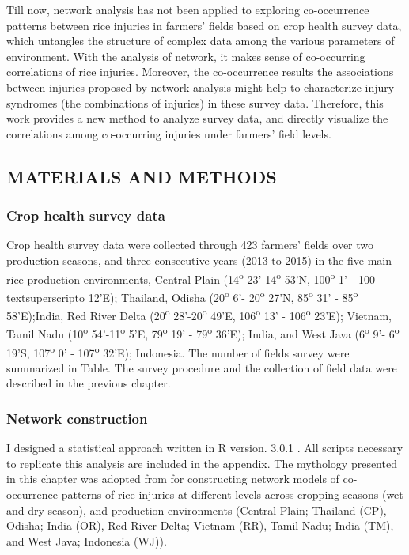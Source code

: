 Till now, network analysis has not been applied to exploring co-occurrence patterns between rice injuries in farmers’ fields based on crop health survey data, which untangles the structure of complex data among the various parameters of environment. With the analysis of network, it makes sense of co-occurring correlations of rice injuries. Moreover, the co-occurrence results the associations between injuries proposed by network analysis might help to characterize  injury syndromes (the combinations of injuries) in these survey data. Therefore, this work provides a new method to analyze survey data, and directly visualize the correlations among co-occurring injuries under farmers’ field levels.

\newpage
\subsection{MATERIALS AND METHODS} 

\subsubsection{Crop health survey data}
Crop health survey data were collected through 423 farmers’ fields over two production seasons, and three consecutive years (2013 to 2015) in the five main rice production environments, Central Plain (14\textsuperscript{o} 23’-14\textsuperscript{o} 53’N, 100\textsuperscript{o} 1’ - 100 textsuperscript{o} 12’E); Thailand, Odisha (20\textsuperscript{o} 6’- 20\textsuperscript{o} 27’N, 85\textsuperscript{o} 31’ - 85\textsuperscript{o} 58’E);India, Red River Delta (20\textsuperscript{o} 28’-20\textsuperscript{o} 49’E, 106\textsuperscript{o} 13’ - 106\textsuperscript{o}  23’E); Vietnam, Tamil Nadu (10\textsuperscript{o} 54’-11\textsuperscript{o} 5’E, 79\textsuperscript{o} 19’ - 79\textsuperscript{o}  36’E); India, and West Java (6\textsuperscript{o} 9’- 6\textsuperscript{o} 19’S, 107\textsuperscript{o} 0’ - 107\textsuperscript{o}  32’E); Indonesia. The number of fields survey were summarized in Table. The survey procedure and the collection of field data were described in  the previous chapter.


\subsubsection{Network construction}
I designed a statistical approach written in R version. 3.0.1 \citep{R_2015}. All scripts necessary to replicate this analysis are included in the appendix. The mythology presented in this chapter was adopted from \citet{Williams_2014_demonstrating} for constructing network models of co-occurrence patterns of rice injuries at different levels across cropping seasons (wet and dry season), and production environments (Central Plain; Thailand (CP), Odisha; India (OR), Red River Delta; Vietnam (RR), Tamil Nadu; India (TM), and West Java; Indonesia (WJ)). 

